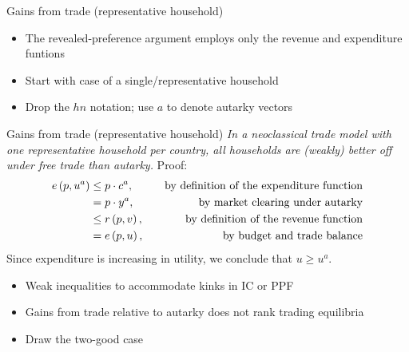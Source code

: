 \documentclass[11pt,notes=hide,aspectratio=169]{beamer}
\begin{document}
\begin{frame}{Gains from trade (representative household)}
\begin{itemize}
	\item The revealed-preference argument employs only the revenue and expenditure funtions
	\item Start with case of a single/representative household
	\item Drop the $hn$ notation; use $a$ to denote autarky vectors
\end{itemize}
\end{frame}
\begin{frame}{Gains from trade (representative household)}
\textit{In a neoclassical trade model with one representative household per country,
all households are (weakly) better off under free trade than autarky.}
Proof:
\begin{align*}
e\left( p,u^{a}\right) &\leq p \cdot c^{a} , &\text{\quad by definition of the expenditure function} \\
&=p \cdot y^{a} , &\text{\quad by market clearing under autarky} \\
&\leq r\left( p,v\right)  , &\text{\quad by definition of the revenue function} \\
&=e\left( p,u\right)  , &\text{\quad by budget and trade balance}
\end{align*}
Since expenditure is increasing in utility, we conclude that $u \geq u^a$.\\
\begin{itemize}
	\item Weak inequalities to accommodate kinks in IC or PPF
	\item Gains from trade relative to autarky does not rank trading equilibria
	\item Draw the two-good case
\end{itemize}
\end{frame}
\end{document}

